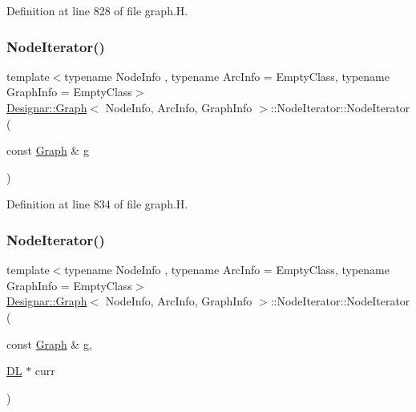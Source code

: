 Definition at line 828 of file graph.\+H.

\mbox{\label{class_designar_1_1_graph_1_1_node_iterator_a646f28f9dbd99df7317dd0cf22122f42}} 
\subsubsection{\texorpdfstring{Node\+Iterator()}{NodeIterator()}\hspace{0.1cm}{\footnotesize\ttfamily [2/5]}}
{\footnotesize\ttfamily template$<$typename Node\+Info , typename Arc\+Info  = Empty\+Class, typename Graph\+Info  = Empty\+Class$>$ \\
\hyperlink{class_designar_1_1_graph}{Designar\+::\+Graph}$<$ Node\+Info, Arc\+Info, Graph\+Info $>$\+::Node\+Iterator\+::\+Node\+Iterator (\begin{DoxyParamCaption}\item[{const \hyperlink{class_designar_1_1_graph}{Graph} \&}]{g }\end{DoxyParamCaption})\hspace{0.3cm}{\ttfamily [inline]}}



Definition at line 834 of file graph.\+H.

\mbox{\label{class_designar_1_1_graph_1_1_node_iterator_abc568563840c41429af62d925d45afc6}} 
\subsubsection{\texorpdfstring{Node\+Iterator()}{NodeIterator()}\hspace{0.1cm}{\footnotesize\ttfamily [3/5]}}
{\footnotesize\ttfamily template$<$typename Node\+Info , typename Arc\+Info  = Empty\+Class, typename Graph\+Info  = Empty\+Class$>$ \\
\hyperlink{class_designar_1_1_graph}{Designar\+::\+Graph}$<$ Node\+Info, Arc\+Info, Graph\+Info $>$\+::Node\+Iterator\+::\+Node\+Iterator (\begin{DoxyParamCaption}\item[{const \hyperlink{class_designar_1_1_graph}{Graph} \&}]{g,  }\item[{\hyperlink{class_designar_1_1_d_l}{DL} $\ast$}]{curr }\end{DoxyParamCaption})\hspace{0.3cm}{\ttfamily [inline]}}




